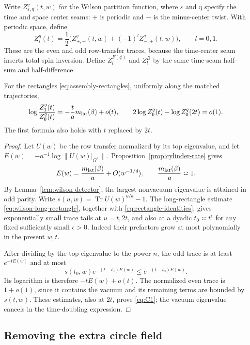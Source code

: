 Write $Z^q_{\varepsilon,\eta}(t,w)$ for the Wilson partition function,
where $\varepsilon$ and $\eta$ specify the time and space center seams:
$+$ is periodic and $-$ is the minus-center twist. With periodic space,
define
\[
 Z_l^q(t)=\frac12\bigl(Z^q_{+,+}(t,w)+(-1)^lZ^q_{-,+}(t,w)\bigr),
 \qquad l=0,1.
\]
These are the even and odd row-transfer traces, because the time-center
seam inserts total spin inversion. Define $Z_l^{F(\phi)}$ and $Z_l^B$
by the same time-seam half-sum and half-difference.

\begin{lemma}
\label{lem:assembly-wilson-traces}
For the rectangles \eqref{eq:assembly-rectangles}, uniformly along the
matched trajectories,
\begin{equation}
 \log\frac{Z_1^q(t)}{Z_0^q(t)}
       =-\frac{t}{a}m_{\rm lat}(\beta)+o(t),
 \qquad
 2\log Z_0^q(t)-\log Z_0^q(2t)=o(1).
 \label{eq:C1}
\end{equation}
The first formula also holds with $t$ replaced by $2t$.
\end{lemma}

\begin{proof}
Let $U(w)$ be the row transfer normalized by its top eigenvalue, and let
$E(w)=-a^{-1}\log\|U(w)|_{\Omega^\perp}\|$. Proposition~\ref{prop:cylinder-rate} gives
\[
 E(w)=\frac{m_{\rm lat}(\beta)}a+O(w^{-1/4}),
 \qquad \frac{m_{\rm lat}(\beta)}a\asymp1.
\]
By Lemma~\ref{lem:wilson-detector}, the largest nonvacuum eigenvalue
is attained in odd parity. Write
$s(u,w)=\operatorname{Tr}U(w)^{u/a}-1$. The long-rectangle estimate
\eqref{eq:wilson-long-rectangle}, together with
\eqref{eq:rectangle-identities}, gives exponentially small trace tails at
$u=t,2t$, and also at a dyadic $t_0\asymp t^\epsilon$ for any fixed
sufficiently small $\epsilon>0$. Indeed their prefactors grow at most
polynomially in the present $w,t$.

After dividing by the top eigenvalue to the power $n$, the odd trace is
at least $e^{-tE(w)}$ and at most
\[
 s(t_0,w)e^{-(t-t_0)E(w)}\le e^{-(t-t_0)E(w)}.
\]
Its logarithm is therefore $-tE(w)+o(t)$. The normalized even trace is
$1+o(1)$, since it contains the vacuum and its remaining terms are bounded
by $s(t,w)$. These estimates, also at $2t$, prove \eqref{eq:C1}; the
vacuum eigenvalue cancels in the time-doubling expression.
\end{proof}

\subsection{Removing the extra circle field}

